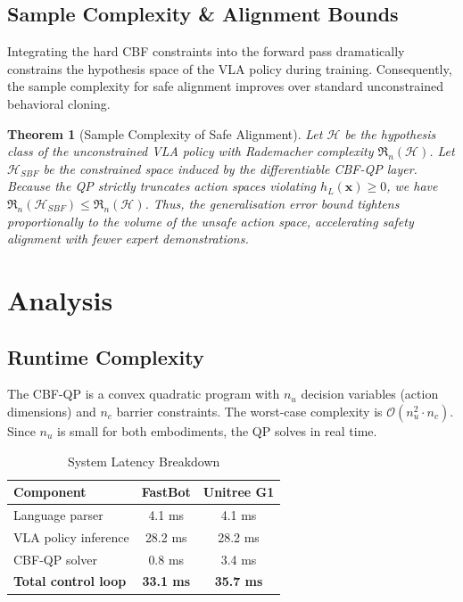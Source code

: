 \documentclass[conference]{IEEEtran}
\newtheorem{theorem}{Theorem}
\begin{document}
\subsection{Sample Complexity \& Alignment Bounds}
Integrating the hard CBF constraints into the forward pass dramatically constrains the hypothesis space of the VLA policy during training. Consequently, the sample complexity for safe alignment improves over standard unconstrained behavioral cloning.

\begin{theorem}[Sample Complexity of Safe Alignment]
Let $\mathcal{H}$ be the hypothesis class of the unconstrained VLA policy with Rademacher complexity $\mathfrak{R}_n(\mathcal{H})$. Let $\mathcal{H}_{SBF}$ be the constrained space induced by the differentiable CBF-QP layer. Because the QP strictly truncates action spaces violating $h_L(\mathbf{x}) \ge 0$, we have $\mathfrak{R}_n(\mathcal{H}_{SBF}) \le \mathfrak{R}_n(\mathcal{H})$. Thus, the generalisation error bound tightens proportionally to the volume of the unsafe action space, accelerating safety alignment with fewer expert demonstrations.
\end{theorem}

\section{Analysis}

\subsection{Runtime Complexity}
The CBF-QP is a convex quadratic program with $n_u$ decision variables (action dimensions) and $n_c$ barrier constraints. The worst-case complexity is $\mathcal{O}(n_u^2 \cdot n_c)$. Since $n_u$ is small for both embodiments, the QP solves in real time.

\begin{table}[h]
\centering
\caption{System Latency Breakdown}
\begin{tabular}{lcc}
\toprule
\textbf{Component} & \textbf{FastBot} & \textbf{Unitree G1} \\
\midrule
Language parser & 4.1 ms & 4.1 ms \\
VLA policy inference & 28.2 ms & 28.2 ms \\
CBF-QP solver & 0.8 ms & 3.4 ms \\
\midrule
\textbf{Total control loop} & \textbf{33.1 ms} & \textbf{35.7 ms} \\
\bottomrule
\end{tabular}
\end{table}
\end{document}
